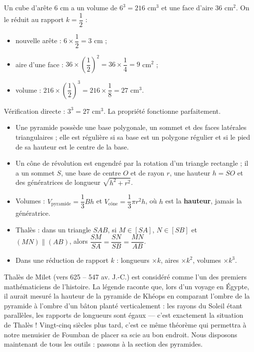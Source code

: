 \documentclass[11pt]{article}
\newcommand{\cle}[1]{{\popxbold\color{popdark}#1}}
\begin{document}
\begin{exemplebox}
Un cube d'arête $6$ cm a un volume de $6^3 = 216$ cm$^3$ et une face d'aire $36$ cm$^2$. On le réduit au rapport $k = \dfrac{1}{2}$ :
\begin{itemize}
\item nouvelle arête : $6 \times \dfrac{1}{2} = 3$ cm ;
\item aire d'une face : $36 \times \left(\dfrac{1}{2}\right)^2 = 36 \times \dfrac{1}{4} = 9$ cm$^2$ ;
\item volume : $216 \times \left(\dfrac{1}{2}\right)^3 = 216 \times \dfrac{1}{8} = 27$ cm$^3$.
\end{itemize}
Vérification directe : $3^3 = 27$ cm$^3$. La propriété fonctionne parfaitement.
\end{exemplebox}

\begin{aretenir}
\begin{itemize}
\item Une \cle{pyramide} possède une base polygonale, un sommet et des faces latérales triangulaires ; elle est \cle{régulière} si sa base est un polygone régulier et si le pied de sa hauteur est le centre de la base.
\item Un \cle{cône de révolution} est engendré par la rotation d'un triangle rectangle ; il a un sommet $S$, une base de centre $O$ et de rayon $r$, une hauteur $h = SO$ et des génératrices de longueur $\sqrt{h^2 + r^2}$.
\item Volumes : $V_{\text{pyramide}} = \dfrac{1}{3}Bh$ et $V_{\text{cône}} = \dfrac{1}{3}\pi r^2 h$, où $h$ est la \textbf{hauteur}, jamais la génératrice.
\item \cle{Thalès} : dans un triangle $SAB$, si $M \in [SA]$, $N \in [SB]$ et $(MN) \parallel (AB)$, alors $\dfrac{SM}{SA} = \dfrac{SN}{SB} = \dfrac{MN}{AB}$.
\item Dans une réduction de rapport $k$ : longueurs $\times k$, aires $\times k^2$, volumes $\times k^3$.
\end{itemize}
\end{aretenir}

\begin{savaistu}
Thalès de Milet (vers 625 -- 547 av. J.-C.) est considéré comme l'un des premiers mathématiciens de l'histoire. La légende raconte que, lors d'un voyage en Égypte, il aurait mesuré la hauteur de la pyramide de Khéops en comparant l'ombre de la pyramide à l'ombre d'un bâton planté verticalement : les rayons du Soleil étant parallèles, les rapports de longueurs sont égaux — c'est exactement la situation de Thalès ! Vingt-cinq siècles plus tard, c'est ce même théorème qui permettra à notre menuisier de Foumban de placer sa scie au bon endroit. Nous disposons maintenant de tous les outils : passons à la section des pyramides.
\end{savaistu}
\end{document}
